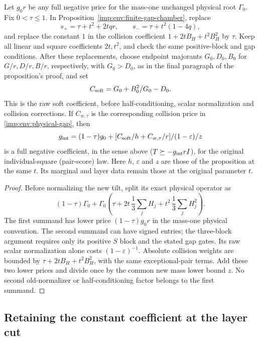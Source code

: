 \begin{corollary}
\label{imp:env:physical-interpolation}
Let $g_0r$ be any full negative price for the mass-one unchanged
physical root $\Gamma_0$.  Fix $0<\tau\le1$.  In
Proposition~\ref{imp:env:finite-gap-chamber}, replace
\[
 s_+=\tau+t^2+2tqr,\qquad s_-=\tau+t^2(1-4q),
\]
and replace the constant $1$ in the collision coefficient
$1+2tB_H+t^2B_H^2$ by $\tau$.  Keep all linear and square
coefficients $2t,t^2$, and check the same positive-block and gap
conditions. After these replacements, choose endpoint majorants
$G_0,D_0,B_0$ for $G/r,D/r,B/r$, respectively, with $G_0>D_0$, as
in the final paragraph of the proposition's proof, and set
\[
 C_{\rm soft}=G_0+\frac{B_0^2}{G_0-D_0}.
\]
This is the raw soft coefficient, before half-conditioning, scalar
normalization and collision corrections. If $C_{w,\tau}$ is the
corresponding collision price in \eqref{imp:env:physical-gap}, then
\[
 g_{\rm int}=
 \frac{(1-\tau)g_0+
       [C_{\rm soft}/h+C_{w,\tau}/r]/(1-\varepsilon)}{z}
\]
is a full negative coefficient, in the sense above
($T\succeq-g_{\rm int}rI$), for the original individual-square
(pair-score) law. Here $h$, $\varepsilon$ and $z$ are those of the proposition at the same $t$.
Its marginal and layer data remain those at the original parameter $t$.
\end{corollary}

\begin{proof}
Before normalizing the new tilt, split its exact physical operator as
\[
 (1-\tau)\Gamma_0+
 \Gamma_0\left(\tau+2t\,\frac13\sum_jH_j
                       +t^2\,\frac13\sum_jH_j^2\right).
\]
The first summand has lower price $(1-\tau)g_0r$ in the mass-one
physical convention.  The second summand can have signed entries;
the three-block argument requires only its positive $S$ block and
the stated gap gates.  Its raw scalar normalization alone costs
$(1-\varepsilon)^{-1}$.  Absolute collision weights are bounded by
$\tau+2tB_H+t^2B_H^2$, with the same exceptional-pair terms.
Add these two lower prices and divide once by the common new mass
lower bound $z$.  No second old-normalizer or half-conditioning
factor belongs to the first summand.
\end{proof}

\subsection{Retaining the constant coefficient at the layer cut}
\label{imp:env:layer-section}

